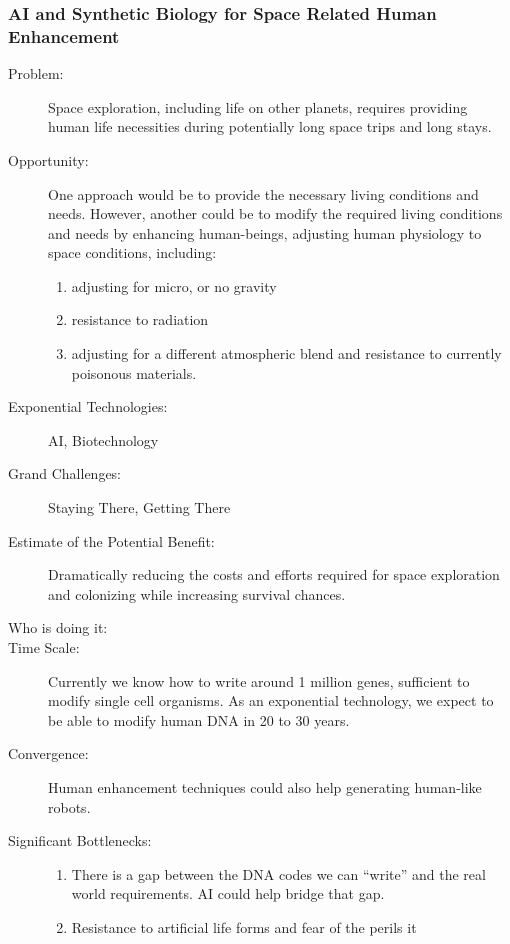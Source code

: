  
\subsubsection{AI and Synthetic Biology for Space Related Human  Enhancement}
\label{enhancement}
\begin{description}
\item[Problem:]Space exploration, including life  on other planets, requires providing human life necessities during  potentially long space trips and long stays. 
 
 \item[Opportunity:] One approach would be to provide  the necessary living conditions and needs. However, another could be to  modify the required living conditions and needs by enhancing  human-beings, adjusting human physiology to space conditions, 
including:
\hfill\begin{enumerate}
\item adjusting for micro, or no  gravity
\item resistance to radiation
\item adjusting for a different  atmospheric blend and resistance to currently poisonous materials.
 \end{enumerate}
 \item[Exponential Technologies:] AI, Biotechnology
 \item[Grand Challenges:] Staying There, Getting There
 \item[Estimate of the Potential  Benefit:]
 Dramatically reducing the costs  and efforts required for space exploration and colonizing while  increasing survival chances.
 \item[Who is doing it:]
 \item[Time Scale:] Currently we know how to write around 1  million genes, sufficient to modify single cell organisms. As an  exponential technology, we expect to be 
able to  modify human DNA in 20 to 30 years.
 \item[Convergence:] Human enhancement techniques  could also help generating human-like robots.
 \item[Significant  Bottlenecks:]
 \hfill\begin{enumerate}
 \item There is a gap between the DNA  codes we can ``write'' and the real world requirements. AI could help bridge  that gap.
 \item Resistance to artificial life  forms and fear of the perils it 
 \end{enumerate}
  \end{description}



